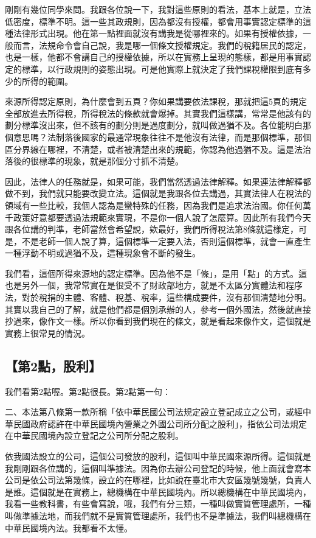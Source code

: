 \documentclass[]{ctexbook}
\begin{document}
剛剛有幾位同學來問。我跟各位說一下，我對這些原則的看法，基本上就是，立法低密度，標準不明。這一些其政規則，因為都沒有授權，都會用事實認定標準的這種法律形式出現。他在第一點裡面就沒有講我是從哪裡來的。如果有授權依據，一般而言，法規命令會自己說，我是哪一個條文授權規定。我們的稅籍居民的認定，也是一樣，他都不會講自己的授權依據，所以在實務上呈現的態樣，都是用事實認定的標準，以行政規則的姿態出現。可是他實際上就決定了我們課稅權限到底有多少的所得的範圍。

來源所得認定原則，為什麼會到五頁？你如果講要依法課稅，那就把這5頁的規定全部放進去所得稅，所得稅法的條款就會爆掉。其實我們這樣講，常常是他該有的劃分標準沒出來，但不該有的劃分則是過度劃分，就叫做過猶不及。各位能明白那個意思嗎？法制落後國家的最通常現象往往不是他沒有法律，而是那個標準，那個區分界線在哪裡，不清楚，或者被清楚出來的規範，你認為他過猶不及。這是法治落後的很標準的現象，就是那個分寸抓不清楚。

因此，法律人的任務就是，如果可能，我們當然透過法律解釋。如果連法律解釋都做不到，我們就只能要改變立法。這個就是我跟各位去講過，其實法律人在稅法的領域有一些比較，我個人認為是蠻特殊的任務，因為我們是追求法治國。你任何萬千政策好意都要透過法規範來實現，不是你一個人說了怎麼算。因此所有我們今天跟各位講的判準，老師當然會希望說，欸最好，我們所得稅法第8條就這樣定，可是，不是老師一個人說了算，這個標準一定要入法，否則這個標準，就會一直產生一種浮動不明或過猶不及，這種現象會不斷的發生。

我們看，這個所得來源地的認定標準。因為他不是「條」，是用「點」的方式。這也是另外一個，我常常實在是很受不了財政部地方，就是不太區分實體法和程序法，對於稅捐的主體、客體、稅基、稅率，這些構成要件，沒有那個清楚地分明。其實以我自己的了解，就是他們都是個別承辦的人，參考一個外國法，然後就直接抄過來，像作文一樣。所以你看到我們現在的條文，就是看起來像作文，這個就是實務上很常見的情況。

\hypertarget{ux7b2c2ux9edeux80a1ux5229}{%
\subsection{【第2點，股利】}\label{ux7b2c2ux9edeux80a1ux5229}}

我們看第2點喔。第2點很長。第2點第一句：

二、本法第八條第一款所稱「依中華民國公司法規定設立登記成立之公司，或經中華民國政府認許在中華民國境內營業之外國公司所分配之股利」，指依公司法規定在中華民國境內設立登記之公司所分配之股利。

依我國法設立的公司，這個公司發放的股利，這個叫中華民國來源所得。這個就是我剛剛跟各位講的，這個叫準據法。因為你去辦公司登記的時候，他上面就會寫本公司是依公司法第幾條，設立的在哪裡，比如說在臺北市大安區幾號幾號，負責人是誰。這個就是在實務上，總機構在中華民國境內。所以總機構在中華民國境內，我看一些教科書，有些會寫說，哦，我們有分三類，一種叫做實質管理處所，一種叫做準據法地，而我們就不是實質管理處所，我們也不是準據法，我們叫總機構在中華民國境內法。我都看不太懂。
\end{document}
